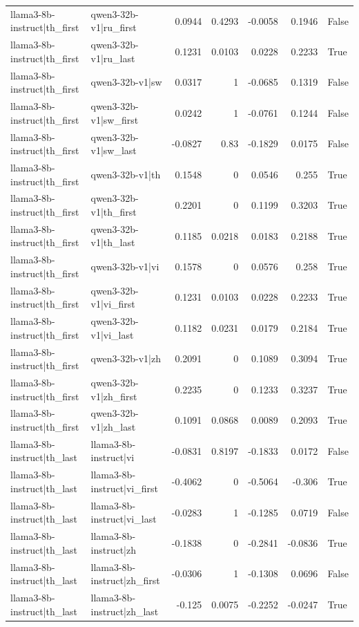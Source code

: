 \begin{table}
\begin{tabular}{l l r r r r l}
llama3-8b-instruct|th_first & qwen3-32b-v1|ru_first & 0.0944 & 0.4293 & -0.0058 & 0.1946 & False \\
llama3-8b-instruct|th_first & qwen3-32b-v1|ru_last & 0.1231 & 0.0103 & 0.0228 & 0.2233 & True \\
llama3-8b-instruct|th_first & qwen3-32b-v1|sw & 0.0317 & 1 & -0.0685 & 0.1319 & False \\
llama3-8b-instruct|th_first & qwen3-32b-v1|sw_first & 0.0242 & 1 & -0.0761 & 0.1244 & False \\
llama3-8b-instruct|th_first & qwen3-32b-v1|sw_last & -0.0827 & 0.83 & -0.1829 & 0.0175 & False \\
llama3-8b-instruct|th_first & qwen3-32b-v1|th & 0.1548 & 0 & 0.0546 & 0.255 & True \\
llama3-8b-instruct|th_first & qwen3-32b-v1|th_first & 0.2201 & 0 & 0.1199 & 0.3203 & True \\
llama3-8b-instruct|th_first & qwen3-32b-v1|th_last & 0.1185 & 0.0218 & 0.0183 & 0.2188 & True \\
llama3-8b-instruct|th_first & qwen3-32b-v1|vi & 0.1578 & 0 & 0.0576 & 0.258 & True \\
llama3-8b-instruct|th_first & qwen3-32b-v1|vi_first & 0.1231 & 0.0103 & 0.0228 & 0.2233 & True \\
llama3-8b-instruct|th_first & qwen3-32b-v1|vi_last & 0.1182 & 0.0231 & 0.0179 & 0.2184 & True \\
llama3-8b-instruct|th_first & qwen3-32b-v1|zh & 0.2091 & 0 & 0.1089 & 0.3094 & True \\
llama3-8b-instruct|th_first & qwen3-32b-v1|zh_first & 0.2235 & 0 & 0.1233 & 0.3237 & True \\
llama3-8b-instruct|th_first & qwen3-32b-v1|zh_last & 0.1091 & 0.0868 & 0.0089 & 0.2093 & True \\
llama3-8b-instruct|th_last & llama3-8b-instruct|vi & -0.0831 & 0.8197 & -0.1833 & 0.0172 & False \\
llama3-8b-instruct|th_last & llama3-8b-instruct|vi_first & -0.4062 & 0 & -0.5064 & -0.306 & True \\
llama3-8b-instruct|th_last & llama3-8b-instruct|vi_last & -0.0283 & 1 & -0.1285 & 0.0719 & False \\
llama3-8b-instruct|th_last & llama3-8b-instruct|zh & -0.1838 & 0 & -0.2841 & -0.0836 & True \\
llama3-8b-instruct|th_last & llama3-8b-instruct|zh_first & -0.0306 & 1 & -0.1308 & 0.0696 & False \\
llama3-8b-instruct|th_last & llama3-8b-instruct|zh_last & -0.125 & 0.0075 & -0.2252 & -0.0247 & True \\

\end{tabular}
\end{table}

